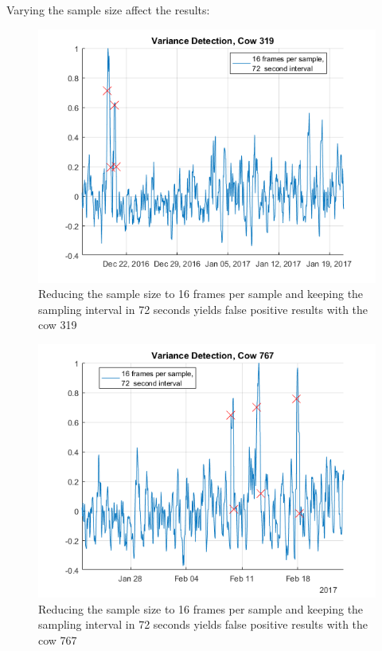 \documentclass[english,12pt,a4paper,pdftex,elec,utf8]{aaltothesis}
\begin{document}
Varying the sample size affect the results:


\begin{figure}[htb]
\centering
\includegraphics[width = 0.75 \textwidth]{figures/VarianceDetectionCow319_16frames72seconds.png}
\caption{Reducing the sample size to 16 frames per sample and keeping the sampling interval in 72 seconds yields false positive results with the cow 319}
\label{}
\end{figure}

\begin{figure}[htb]
\centering
\includegraphics[width = 0.75 \textwidth]{figures/VarianceDetectionCow767_16frames72seconds.png}
\caption{Reducing the sample size to 16 frames per sample and keeping the sampling interval in 72 seconds yields false positive results with the cow 767}
\label{}
\end{figure}

\end{document}
